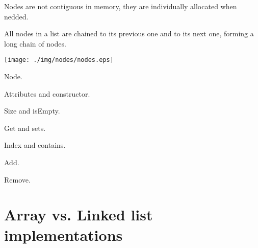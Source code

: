 \documentclass[a4paper, 9pt]{extarticle}
\begin{document}
Nodes are not contiguous in memory, they are individually allocated when nedded.

All nodes in a list are chained to its previous one and to its next one, forming a long chain of nodes.

\begin{center}
  \texttt{[image: ./img/nodes/nodes.eps]}
\end{center}

Node.

Attributes and constructor.


Size and isEmpty.


Get and sets.


Index and contains.


Add.


Remove.







\section{Array vs. Linked list implementations}
\end{document}
